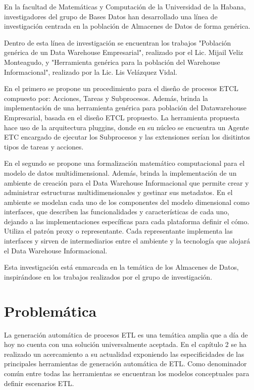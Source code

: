 En la facultad de Matemáticas y Computación de la Universidad de la Habana, investigadores del grupo de Bases 
Datos han desarrollado una línea de investigación centrada en la poblaci\'on de Almacenes de Datos de forma gen\'erica. 

Dentro de esta l\'inea de investigación se encuentran los trabajos "Población genérica de un Data Warehouse Empresarial", 
realizado por el Lic. Mijail Veliz Monteagudo, y "Herramienta genérica para la población del Warehouse Informacional", 
realizado por la Lic. Lis Velázquez Vidal.

En el primero se propone un procedimiento para el diseño de procesos ETCL compuesto por: Acciones, Tareas y Subprocesos.
Además, brinda la implementación de una herramienta genérica para población del Datawarehouse Empresarial, basada en el 
diseño ETCL propuesto. La herramienta propuesta hace uso de la arquitectura pluggins, donde en su n\'ucleo se encuentra 
un Agente ETC encargado de ejecutar los Subprocesos y las extensiones ser\'ian los disitintos tipos de tareas y acciones.

En el segundo se propone una formalización matemático computacional para el modelo de datos multidimensional. Además,
brinda la implementación de un ambiente de creación para el Data Warehouse Informacional que permite crear y administrar 
estructuras multidimensionales y gestinar sus metadatos. En el ambiente se modelan cada uno de los componentes del modelo 
dimensional como interfaces, que describen las funcionalidades y caracter\'isticas de cada uno, dejando a las implementaciones 
espec\'ificas para cada plataforma definir el c\'omo. Utiliza el patr\'on proxy o representante. Cada representante implementa 
las interfaces y sirven de intermediarios entre el ambiente y la tecnología que alojar\'a el Data Warehouse Informacional.

Esta investigaci\'on est\'a enmarcada en la tem\'atica de los Almacenes de Datos, inspir\'andose en los trabajos 
realizados por el grupo de investigación.


\section{Problem\'atica}

La generaci\'on autom\'atica de procesos ETL es una tem\'atica amplia que a d\'ia de hoy no cuenta con una soluci\'on 
universalmente aceptada. En el cap\'itulo 2 se ha realizado un acercamiento a su actualidad exponiendo las 
especificidades de las principales herramientas de generaci\'on autom\'atica de ETL. Como denominador com\'un entre 
todas las herramientas se encuentran los modelos conceptuales para definir escenarios ETL.

